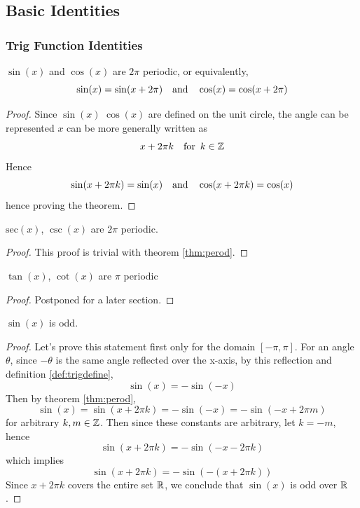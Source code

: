 \subsection{Basic Identities}
\subsubsection{Trig Function Identities}
\begin{theorem}
\label{thm:perod}
$\sin(x)$ and $\cos(x)$ are $2\pi$ periodic, or equivalently,
$$\sin(x)=\sin(x+2\pi) \quad\text{and}\quad \cos(x)=\cos(x+2\pi)$$
\end{theorem}
\begin{proof}
	Since $\sin(x)$ $\cos(x)$ are defined on the unit circle, the angle can be represented $x$ can be more generally written as
	$$x+2\pi k \quad\text{for }\, k\in\mathbb{Z}$$
	Hence
	$$\sin(x+2\pi k)=\sin(x) \quad\text{and}\quad
	\cos(x+2\pi k)=\cos(x)$$
	hence proving the theorem.
\end{proof}

\begin{cor}
	$\text{sec}(x)$, $\csc(x)$ are $2\pi$ periodic.
\end{cor}
\begin{proof}
	This proof is trivial with theorem \eqref{thm:perod}.
\end{proof}

\begin{theorem}
$\tan(x)$, $\cot(x)$ are $\pi$ periodic
\label{thm:tanperodic}
\end{theorem}
\begin{proof}
	Postponed for a later section.
\end{proof}

\begin{theorem}
	$\sin(x)$ is odd.
	\label{thm:sinodd}
\end{theorem}
\begin{proof}
	Let's prove this statement first only for the domain $[-\pi,\pi]$.
	For an angle $\theta$, since $-\theta$ is the same angle reflected over the x-axis, by this reflection and definition \eqref{def:trigdefine},
	$$\sin(x)=-\sin(-x)$$
	Then by theorem \eqref{thm:perod},
	$$\sin(x)=\sin(x+2\pi k)=-\sin(-x)=-\sin(-x+2\pi m)$$
	for arbitrary $k,m\in\mathbb{Z}$. Then since these constants are arbitrary, let $k=-m$, hence
	$$\sin(x+2\pi k)=-\sin(-x-2\pi k)$$
	which implies
	$$\sin(x+2\pi k)=-\sin(-(x+2\pi k))$$
	Since $x+2\pi k$ covers the entire set $\mathbb{R}$, we conclude that $\sin(x)$ is odd over $\mathbb{R}$.
\end{proof}

